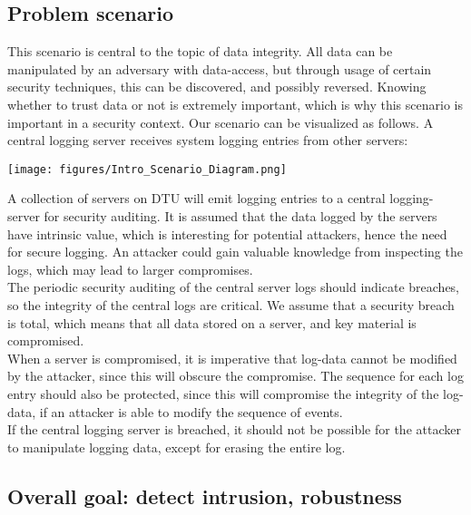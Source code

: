 \subsection{Problem scenario}

This scenario is central to the topic of data integrity. All data can be manipulated by an adversary with data-access, but through usage of certain security techniques, this can be discovered, and possibly reversed. Knowing whether to trust data or not is extremely important, which is why this scenario is important in a security context.
Our scenario can be visualized as follows. A central logging server receives system logging entries from other servers:
\\

\begin{center}
    \texttt{[image: figures/Intro\_Scenario\_Diagram.png]}
\end{center}

A collection of servers on DTU will emit logging entries to a central logging-server for security auditing. It is assumed that the data logged by the servers have intrinsic value, which is interesting for potential attackers, hence the need for secure logging. An attacker could gain valuable knowledge from inspecting the logs, which may lead to larger compromises.
\\The periodic security auditing of the central server logs should indicate breaches, so the integrity of the central logs are critical.
We assume that a security breach is total, which means that all data stored on a server, and key material is compromised.
\\When a server is compromised, it is imperative that log-data cannot be modified by the attacker, since this will obscure the compromise.
The sequence for each log entry should also be protected, since this will compromise the integrity of the log-data, if an attacker is able to modify the sequence of events.
\\If the central logging server is breached, it should not be possible for the attacker to manipulate logging data, except for erasing the entire log.

\subsection{Overall goal: detect intrusion, robustness}

